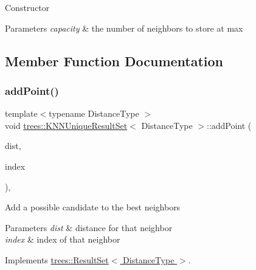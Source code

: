 Constructor 
\begin{DoxyParams}{Parameters}
{\em capacity} & the number of neighbors to store at max \\
\hline
\end{DoxyParams}


\subsection{Member Function Documentation}
\mbox{\label{classtrees_1_1_k_n_n_unique_result_set_af5525c7d03d3c2f37031b46207aec3a2}} 
\subsubsection{\texorpdfstring{add\+Point()}{addPoint()}}
{\footnotesize\ttfamily template$<$typename Distance\+Type $>$ \\
void \hyperlink{classtrees_1_1_k_n_n_unique_result_set}{trees\+::\+K\+N\+N\+Unique\+Result\+Set}$<$ Distance\+Type $>$\+::add\+Point (\begin{DoxyParamCaption}\item[{Distance\+Type}]{dist,  }\item[{size\+\_\+t}]{index }\end{DoxyParamCaption})\hspace{0.3cm}{\ttfamily [inline]}, {\ttfamily [virtual]}}

Add a possible candidate to the best neighbors 
\begin{DoxyParams}{Parameters}
{\em dist} & distance for that neighbor \\
\hline
{\em index} & index of that neighbor \\
\hline
\end{DoxyParams}


Implements \hyperlink{classtrees_1_1_result_set}{trees\+::\+Result\+Set$<$ Distance\+Type $>$}.

\mbox{\label{classtrees_1_1_k_n_n_unique_result_set_aaa6184d20236d8ebe5facb2560751e88}} 
